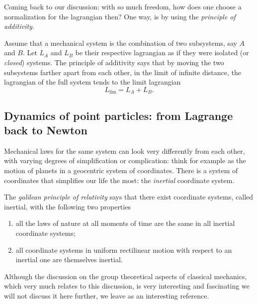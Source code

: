 \documentclass[english,fontsize=11pt,paper=a5,oneside]{scrbook}
\theoremstyle{definition}
\begin{document}
    Coming back to our discussion: with so much freedom, how does one choose a normalization for the lagrangian then?
    One way, is by using the \emph{principle of additivity}.
    \begin{tcolorbox}
        Assume that a mechanical system is the combination of two subsystems, say $A$ and $B$.
        Let $L_A$ and $L_B$ be their respective lagrangian as if they were isolated (or \emph{closed}) systems.
        The principle of additivity says that by moving the two subsystems farther apart from each other, in the limit of infinite distance, the lagrangian of the full system tends to the limit lagrangian
        \begin{equation}
            L_{\lim} = L_A + L_B.
        \end{equation}
    \end{tcolorbox}


\subsection{Dynamics of point particles: from Lagrange back to Newton}\label{sec:dynamicspps}

Mechanical laws for the same system can look very differently from each other, with varying degrees of simplification or complication: think for example as the motion of planets in a geocentric system of coordinates.
There is a system of coordinates that simplifies our life the most: the \emph{inertial} coordinate system.

\begin{tcolorbox}
The \emph{galilean principle of relativity} says that there exist coordinate systems, called inertial, with the following two properties
\begin{enumerate}
    \item all the laws of nature at all moments of time are the same in all inertial coordinate systems;
    \item all coordinate systems in uniform rectilinear motion with respect to an inertial one are themselves inertial.
\end{enumerate}
\end{tcolorbox}

Although the discussion on the group theoretical aspects of classical mechanics, which very much relates to this discussion, is very interesting and fascinating we will not discuss it here further, we leave \cite{book:marsdenratiu} as an interesting reference.
\end{document}
